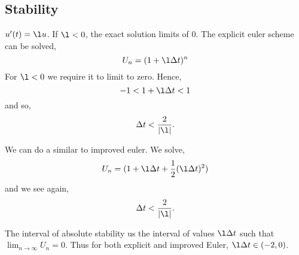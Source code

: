 \subsection{Stability}
$u'(t) = \l u$. If $\l < 0$, the exact solution limits of $0$. The explicit euler scheme can be solved,
$$ U_n = (1 + \l \Delta t)^n $$
For $\l < 0$ we require it to limit to zero. Hence,
$$ -1 < 1+ \l \Delta t < 1 $$
and so,
$$ \Delta t < \frac{2}{|\l|}. $$

\noindent
We can do a similar to improved euler. We solve,
$$ U_n = (1 + \l \Delta t + \frac{1}{2}(\l \Delta t)^2) $$
and we see again,
$$ \Delta t < \frac{2}{|\l|}. $$

\noindent
The interval of absolute stability us the interval of values $\l \Delta t$ such that $\lim_{n \to \infty} U_n = 0$. Thus for both explicit and improved Euler, $\l \Delta t \in (-2, 0)$.